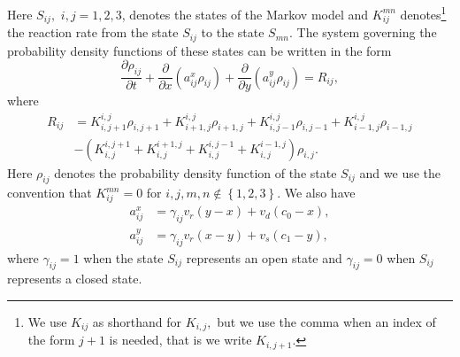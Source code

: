 Here $S_{ij},$ $i,j=1,2,3$, denotes the states of the Markov model and
$K_{ij}^{mn}$ denotes\footnote{We use $K_{ij}$ as shorthand for $K_{i,j},$ but
we use the comma when an index of the form $j+1$ is needed, that is we write
$K_{i,j+1}.$} the reaction rate from the state $S_{ij}$ to the state $S_{mn}.$
The system governing the probability density functions of these states can be
written in the form
\begin{equation}
\frac{\partial\rho_{ij}}{\partial t}+\frac{\partial}{\partial x}\left(
a_{ij}^{x}\rho_{ij}\right)  +\frac{\partial}{\partial y}\left(  a_{ij}^{y}
\rho_{ij}\right)  =R_{ij},\label{pdf99}
\end{equation}
where
\begin{align*}
R_{ij}  & =K_{i,j+1}^{i,j}\rho_{i,j+1}+K_{i+1,j}^{i,j}\rho_{i+1,j}
+K_{i,j-1}^{i,j}\rho_{i,j-1}+K_{i-1,j}^{i,j}\rho_{i-1,j}\\
& -\left(  K_{i,j}^{i,j+1}+K_{i,j}^{i+1,j}+K_{i,j}^{i,j-1}+K_{i,j}
^{i-1,j}\right)  \rho_{i,j}.
\end{align*}
Here $\rho_{ij}$ denotes the probability density function of the state
$S_{ij}$ and we use the convention that $K_{ij}^{mn}=0$ for $i,j,m,n\notin
\left\{  1,2,3\right\}  .$ We also have
\begin{align*}
a_{ij}^{x} &  =\gamma_{ij}v_{r}\left(  y-x\right)  +v_{d}\left(
c_{0}-x\right)  ,\\
a_{ij}^{y} &  =\gamma_{ij}v_{r}\left(  x-y\right)  +v_{s}\left(
c_{1}-y\right)  ,
\end{align*}
where $\gamma_{ij}=1$ when the state $S_{ij}$ represents an open state and
$\gamma_{ij}=0$ when $S_{ij}$ represents a closed state.



